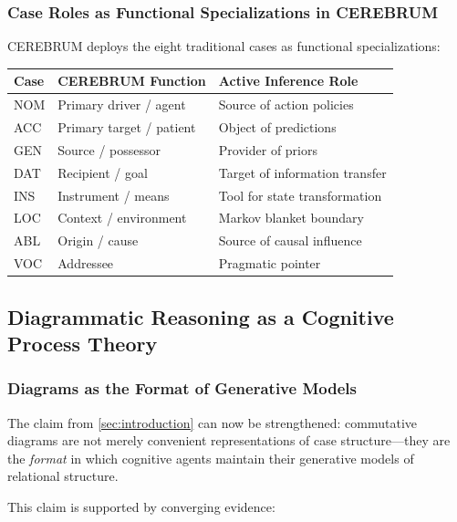 \documentclass[
]{article}
\newcounter{none} %
\numberwithin{equation}{section}
\begin{document}
\subsubsection{Case Roles as Functional Specializations in
CEREBRUM}\label{case-roles-as-functional-specializations-in-cerebrum}

CEREBRUM deploys the eight traditional cases as functional
specializations:

{\def\LTcaptype{none} %
\begin{longtable}[]{@{}lll@{}}
\toprule\noalign{}
Case & CEREBRUM Function & Active Inference Role \\
\midrule\noalign{}
\endhead
\bottomrule\noalign{}
\endlastfoot
NOM & Primary driver / agent & Source of action policies \\
ACC & Primary target / patient & Object of predictions \\
GEN & Source / possessor & Provider of priors \\
DAT & Recipient / goal & Target of information transfer \\
INS & Instrument / means & Tool for state transformation \\
LOC & Context / environment & Markov blanket boundary \\
ABL & Origin / cause & Source of causal influence \\
VOC & Addressee & Pragmatic pointer \\
\end{longtable}
}

\subsection{Diagrammatic Reasoning as a Cognitive Process
Theory}\label{diagrammatic-reasoning-as-a-cognitive-process-theory}

\subsubsection{Diagrams as the Format of Generative
Models}\label{diagrams-as-the-format-of-generative-models}

The claim from \autoref{sec:introduction} can now be strengthened:
commutative diagrams are not merely convenient representations of case
structure---they are the \emph{format} in which cognitive agents
maintain their generative models of relational structure.

This claim is supported by converging evidence:
\end{document}
